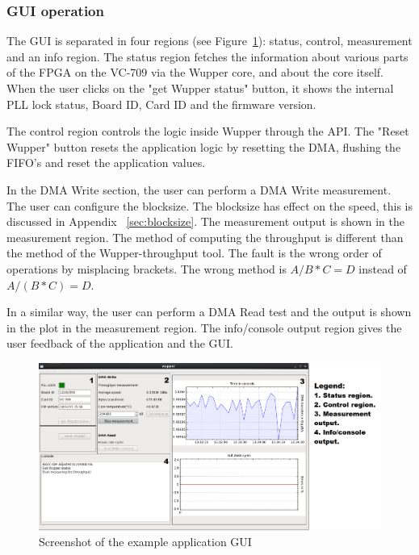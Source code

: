 \newpage
\subsubsection {GUI operation}

The GUI is separated in four regions (see Figure~\ref{fig:wuppergui}): status, control, measurement and an info region.
The status region fetches the information about various parts of the FPGA on the VC-709 via the Wupper core, and about the core itself. When the user clicks on the "get Wupper status" button, it shows the internal PLL lock status, Board ID, Card ID and the firmware version.

The control region controls the logic inside Wupper through the API. The "Reset Wupper" button resets the application logic by resetting the DMA, flushing the FIFO's and reset the application values. 

In the DMA Write section, the user can perform a DMA Write measurement. The user can configure the blocksize. The blocksize has effect on the speed, this is discussed in Appendix ~\ref{sec:blocksize}. The measurement output is shown in the measurement region. The method of computing the throughput is different than the method of the Wupper-throughput tool. The fault is the wrong order of operations by misplacing brackets. The wrong method is $A/B*C= D$ instead of $A/(B*C)= D$.

In a similar way, the user can perform a DMA Read test and the output is shown in the plot in the measurement region.
The info/console output region gives the user feedback of the application and the GUI.

\begin{figure}[h]
	\centering
	\includegraphics[width = 1 \textwidth]{figures/gui_printscreen_tb.PNG}	
	\caption{Screenshot of the example application GUI}
	\label{fig:wuppergui}
\end{figure}






\newpage